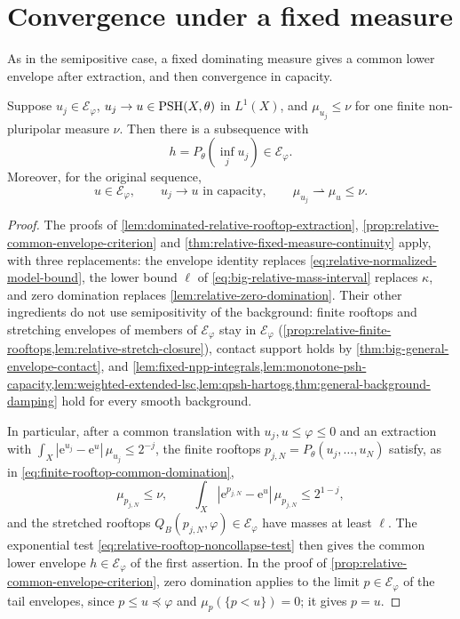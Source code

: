 \section{Convergence under a fixed measure}
\label{sec:big-relative-foundations}
\label{sec:big-relative-continuity}

As in the semipositive case, a fixed dominating measure gives a common lower envelope after extraction, and then convergence in capacity.

\begin{theorem}\label{thm:big-relative-fixed-continuity}
Suppose $u_j\in\mathcal E_\varphi$, $u_j\to u\in\mathrm{PSH}(X,\theta)$ in $L^1(X)$, and $\mu_{u_j}\leq\nu$ for one finite non-pluripolar measure $\nu$. Then there is a subsequence with
\[
 h=P_\theta\left(\inf_j u_j\right)\in\mathcal E_\varphi.
\]
Moreover, for the original sequence,
\[
 u\in\mathcal E_\varphi,\qquad
 u_j\longrightarrow u\text{ in capacity},\qquad
 \mu_{u_j}\rightharpoonup\mu_u\leq\nu.
\]
\end{theorem}
\begin{proof}
The proofs of \cref{lem:dominated-relative-rooftop-extraction}, \cref{prop:relative-common-envelope-criterion} and \cref{thm:relative-fixed-measure-continuity} apply, with three replacements: the envelope identity replaces \eqref{eq:relative-normalized-model-bound}, the lower bound $\ell$ of \eqref{eq:big-relative-mass-interval} replaces $\kappa$, and zero domination replaces \cref{lem:relative-zero-domination}. Their other ingredients do not use semipositivity of the background: finite rooftops and stretching envelopes of members of $\mathcal E_\varphi$ stay in $\mathcal E_\varphi$ (\cref{prop:relative-finite-rooftops,lem:relative-stretch-closure}), contact support holds by \cref{thm:big-general-envelope-contact}, and \cref{lem:fixed-npp-integrals,lem:monotone-psh-capacity,lem:weighted-extended-lsc,lem:qpsh-hartogs,thm:general-background-damping} hold for every smooth background.

In particular, after a common translation with $u_j,u\leq\varphi\leq0$ and an extraction with $\int_X|\mathrm{e}^{u_j}-\mathrm{e}^u|\,\mu_{u_j}\leq2^{-j}$, the finite rooftops $p_{j,N}=P_\theta(u_j,\ldots,u_N)$ satisfy, as in \eqref{eq:finite-rooftop-common-domination},
\begin{equation}\label{eq:big-finite-roof-domination}
 \mu_{p_{j,N}}\leq\nu,\qquad
 \int_X|\mathrm{e}^{p_{j,N}}-\mathrm{e}^u|\,\mu_{p_{j,N}}\leq2^{1-j},
\end{equation}
and the stretched rooftops $Q_B(p_{j,N},\varphi)\in\mathcal E_\varphi$ have masses at least $\ell$. The exponential test \eqref{eq:relative-rooftop-noncollapse-test} then gives the common lower envelope $h\in\mathcal E_\varphi$ of the first assertion. In the proof of \cref{prop:relative-common-envelope-criterion}, zero domination applies to the limit $p\in\mathcal E_\varphi$ of the tail envelopes, since $p\leq u\preceq\varphi$ and $\mu_p(\{p<u\})=0$; it gives $p=u$.
\end{proof}
